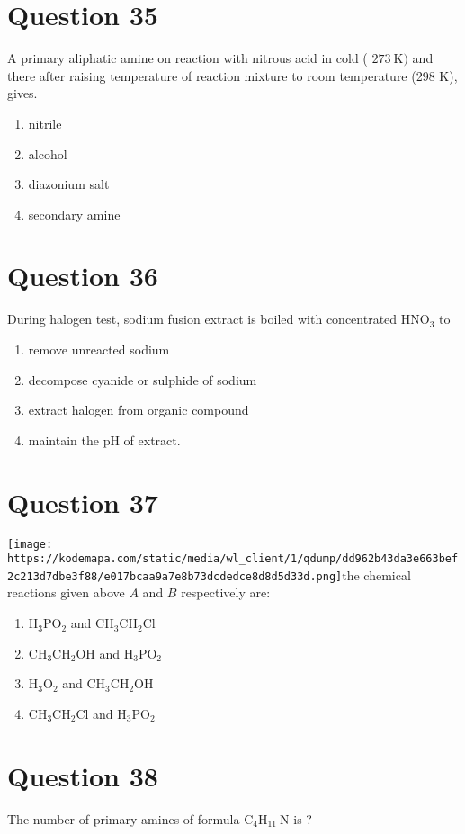 \documentclass{article}
\begin{document}
\section*{Question 35}
A primary aliphatic amine on reaction with nitrous acid in cold ( \(273 \mathrm{~K})\) and there after raising temperature of reaction mixture to room temperature (298 K), gives.
\begin{enumerate}[label=(\alph*)]
\item nitrile
\item alcohol
\item diazonium salt
\item secondary amine
\end{enumerate}
\newpage
\section*{Question 36}
During halogen test, sodium fusion extract is boiled with concentrated \(\mathrm{HNO}_3\) to 
\begin{enumerate}[label=(\alph*)]
\item remove unreacted sodium
\item decompose cyanide or sulphide of sodium
\item extract halogen from organic compound
\item maintain the \(\mathrm{pH}\) of extract.
\end{enumerate}
\newpage
\section*{Question 37}
\texttt{[image: https://kodemapa.com/static/media/wl\_client/1/qdump/dd962b43da3e663bef2c213d7dbe3f88/e017bcaa9a7e8b73dcdedce8d8d5d33d.png]}\newlineIn the chemical reactions given above \(A\) and \(B\) respectively are: 
\begin{enumerate}[label=(\alph*)]
\item \(\mathrm{H}_3 \mathrm{PO}_2\) and \(\mathrm{CH}_3 \mathrm{CH}_2 \mathrm{Cl}\)
\item \(\mathrm{CH}_3 \mathrm{CH}_2 \mathrm{OH}\) and \(\mathrm{H}_3 \mathrm{PO}_2\)
\item \(\mathrm{H}_3 \mathrm{O}_2\) and \(\mathrm{CH}_3 \mathrm{CH}_2 \mathrm{OH}\)
\item \(\mathrm{CH}_3 \mathrm{CH}_2 \mathrm{Cl}\) and \(\mathrm{H}_3 \mathrm{PO}_2\)
\end{enumerate}
\newpage
\section*{Question 38}
The number of primary amines of formula \(\mathrm{C}_4 \mathrm{H}_{11} \mathrm{~N}\) is ? 
\begin{enumerate}[label=(\alph*)]
\end{enumerate}
\newpage
\end{document}
